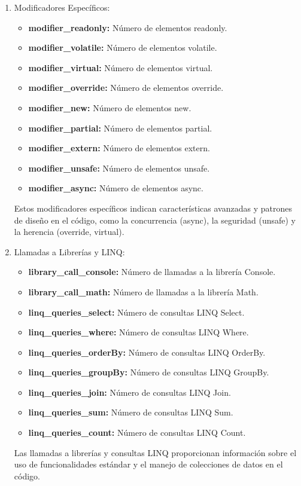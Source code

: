 \begin{enumerate}
    \item Modificadores Específicos:
    \begin{itemize}
        \item {\bf modifier\_readonly:} Número de elementos readonly.
        \item {\bf modifier\_volatile:} Número de elementos volatile.
        \item {\bf modifier\_virtual:} Número de elementos virtual.
        \item {\bf modifier\_override:} Número de elementos override.
        \item {\bf modifier\_new:} Número de elementos new.
        \item {\bf modifier\_partial:} Número de elementos partial.
        \item {\bf modifier\_extern:} Número de elementos extern.
        \item {\bf modifier\_unsafe:} Número de elementos unsafe.
        \item {\bf modifier\_async:} Número de elementos async.
    \end{itemize}
    Estos modificadores específicos indican características avanzadas y patrones de diseño en el código, como la concurrencia (async), la seguridad (unsafe) y la herencia (override, virtual).

    \item Llamadas a Librerías y LINQ:
    \begin{itemize}
        \item {\bf library\_call\_console:} Número de llamadas a la librería Console.
        \item {\bf library\_call\_math:} Número de llamadas a la librería Math.
        \item {\bf linq\_queries\_select:} Número de consultas LINQ Select.
        \item {\bf linq\_queries\_where:} Número de consultas LINQ Where.
        \item {\bf linq\_queries\_orderBy:} Número de consultas LINQ OrderBy.
        \item {\bf linq\_queries\_groupBy:} Número de consultas LINQ GroupBy.
        \item {\bf linq\_queries\_join:} Número de consultas LINQ Join.
        \item {\bf linq\_queries\_sum:} Número de consultas LINQ Sum.
        \item {\bf linq\_queries\_count:} Número de consultas LINQ Count.
    \end{itemize}
    Las llamadas a librerías y consultas LINQ proporcionan información sobre el uso de funcionalidades estándar y el manejo de colecciones de datos en el código.


\end{enumerate}
